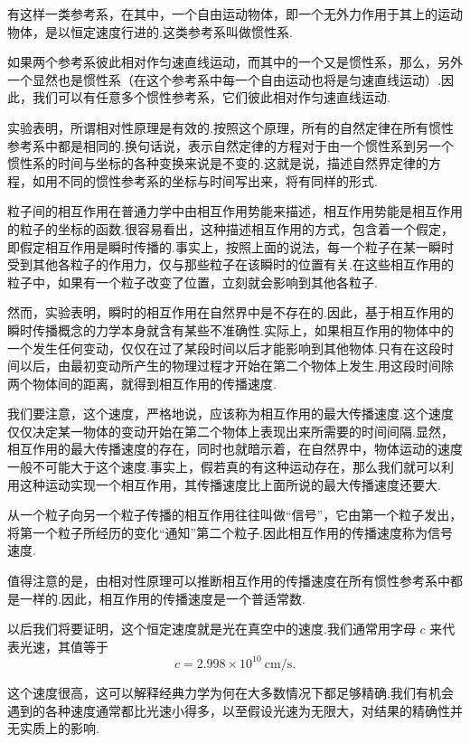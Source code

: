 有这样一类参考系，在其中，一个自由运动物体，即一个无外力作用于其上的运动物体，是以恒定速度行进的.这类参考系叫做惯性系.

如果两个参考系彼此相对作匀速直线运动，而其中的一个又是惯性系，那么，另外一个显然也是惯性系（在这个参考系中每一个自由运动也将是匀速直线运动）.因此，我们可以有任意多个惯性参考系，它们彼此相对作匀速直线运动.

实验表明，所谓相对性原理是有效的.按照这个原理，所有的自然定律在所有惯性参考系中都是相同的.换句话说，表示自然定律的方程对于由一个惯性系到另一个惯性系的时间与坐标的各种变换来说是不变的.这就是说，描述自然界定律的方程，如用不同的惯性参考系的坐标与时间写出来，将有同样的形式.

粒子间的相互作用在普通力学中由相互作用势能来描述，相互作用势能是相互作用的粒子的坐标的函数.很容易看出，这种描述相互作用的方式，包含着一个假定，即假定相互作用是瞬时传播的.事实上，按照上面的说法，每一个粒子在某一瞬时受到其他各粒子的作用力，仅与那些粒子在该瞬时的位置有关.在这些相互作用的粒子中，如果有一个粒子改变了位置，立刻就会影响到其他各粒子.

然而，实验表明，瞬时的相互作用在自然界中是不存在的.因此，基于相互作用的瞬时传播概念的力学本身就含有某些不准确性.实际上，如果相互作用的物体中的一个发生任何变动，仅仅在过了某段时间以后才能影响到其他物体.只有在这段时间以后，由最初变动所产生的物理过程才开始在第二个物体上发生.用这段时间除两个物体间的距离，就得到相互作用的传播速度.

我们要注意，这个速度，严格地说，应该称为相互作用的最大传播速度.这个速度仅仅决定某一物体的变动开始在第二个物体上表现出来所需要的时间间隔.显然，相互作用的最大传播速度的存在，同时也就暗示着，在自然界中，物体运动的速度一般不可能大于这个速度.事实上，假若真的有这种运动存在，那么我们就可以利用这种运动实现一个相互作用，其传播速度比上面所说的最大传播速度还要大.

从一个粒子向另一个粒子传播的相互作用往往叫做“信号”，它由第一个粒子发出，将第一个粒子所经历的变化“通知”第二个粒子.因此相互作用的传播速度称为信号速度.

值得注意的是，由相对性原理可以推断相互作用的传播速度在所有惯性参考系中都是一样的.因此，相互作用的传播速度是一个普适常数.

以后我们将要证明，这个恒定速度就是光在真空中的速度.我们通常用字母 $c$ 来代表光速，其值等于
\begin{equation}
  c=2.998\times 10^{10}\ \mathrm{cm/s}.
\end{equation}

这个速度很高，这可以解释经典力学为何在大多数情况下都足够精确.我们有机会遇到的各种速度通常都比光速小得多，以至假设光速为无限大，对结果的精确性并无实质上的影响.

